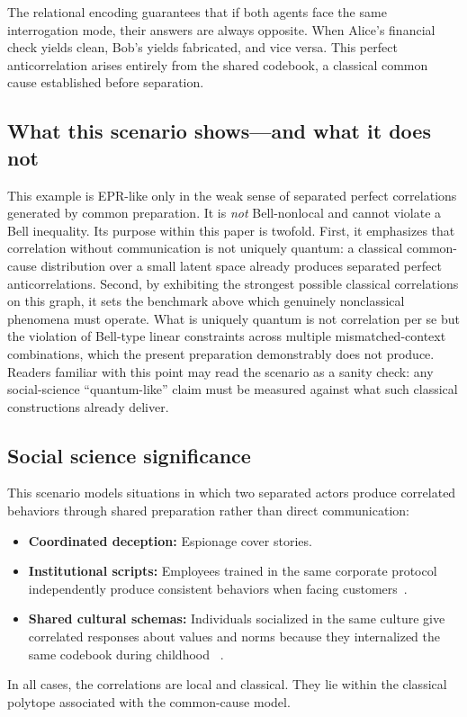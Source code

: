 \documentclass{article}
\begin{document}
The relational encoding guarantees that if both agents face the same
interrogation mode, their answers are always opposite. When Alice's
financial check yields clean, Bob's yields fabricated, and vice
versa. This perfect anticorrelation arises entirely from the shared
codebook, a classical common cause established before separation.

\subsection{What this scenario shows---and what it does not}

This example is EPR-like only in the weak sense of separated perfect
correlations generated by common preparation. It is \emph{not}
Bell-nonlocal and cannot violate a Bell inequality. Its purpose
within this paper is twofold. First, it emphasizes that correlation
without communication is not uniquely quantum: a classical
common-cause distribution over a small latent space already produces
separated perfect anticorrelations. Second, by exhibiting the
strongest possible classical correlations on this graph, it sets the
benchmark above which genuinely nonclassical phenomena must operate.
What is uniquely quantum is not correlation per se but the
violation of Bell-type linear constraints across multiple
mismatched-context combinations, which the present preparation
demonstrably does not produce. Readers familiar with this point may
read the scenario as a sanity check: any social-science
``quantum-like'' claim must be measured against what such classical
constructions already deliver.

\subsection{Social science significance}

This scenario models situations in which two separated actors produce
correlated behaviors through shared preparation rather than direct
communication:
\begin{itemize}
\item \textbf{Coordinated deception:} Espionage cover stories.
\item \textbf{Institutional scripts:} Employees trained in the same
corporate protocol independently produce consistent behaviors when
facing customers~\cite{Cyert1963}.
\item \textbf{Shared cultural schemas:} Individuals socialized in
the same culture give correlated responses about values and norms
because they internalized the same codebook during childhood
~\cite{bordieu-fu}.
\end{itemize}
In all cases, the correlations are local and classical. They lie
within the classical polytope associated with the common-cause model.
\end{document}
